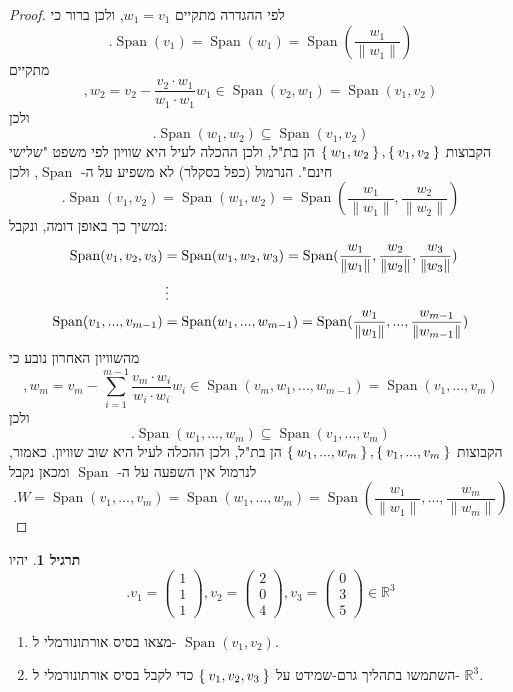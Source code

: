 \documentclass[12pt]{report}
\theoremstyle{plain}
\theoremstyle{definition}
\newtheorem{exercise}{תרגיל}[chapter]
\newcommand{\R}{\mathbb{R}}
\newcommand{\0}{\mathbf{0}}
\DeclareMathOperator{\Span}{Span}
\begin{document}
\begin{proof}
לפי ההגדרה מתקיים
$w_1=v_1$,
ולכן ברור כי
$$
.\Span(v_1)=\Span(w_1)=\Span(\frac{w_1}{\|w_1\|})
$$
מתקיים
$$
,w_2=v_2-\frac{v_2\cdot w_1}{w_1\cdot w_1}w_1\in\Span(v_2,w_1)=\Span(v_1,v_2)
$$
ולכן
$$
.\Span(w_1,w_2)\subseteq\Span(v_1,v_2)
$$
הקבוצות
$\Set{w_1,w_2},\Set{v_1,v_2}$
הן בת"ל, ולכן ההכלה לעיל היא שוויון לפי משפט "שלישי חינם". הנרמול (כפל בסקלר) לא משפיע על ה-
$\Span$,
ולכן 
$$
.\Span(v_1,v_2)=\Span(w_1,w_2)=\Span(\frac{w_1}{\|w_1\|},\frac{w_2}{\|w_2\|})
$$
נמשיך כך באופן דומה, ונקבל:
$$
\begin{aligned}
\Span(v_1,v_2,v_3)&=\Span(w_1,w_2,w_3)=\Span(\frac{w_1}{\|w_1\|},\frac{w_2}{\|w_2\|},\frac{w_3}{\|w_3\|}) \\
&\thinspace\vdots\ \\
\Span(v_1,...,v_{m-1})&=\Span(w_1,...,w_{m-1})=\Span(\frac{w_1}{\|w_1\|},...,\frac{w_{m-1}}{\|w_{m-1}\|})
\end{aligned}
$$
מהשוויון האחרון נובע כי
$$
,w_m=v_m-\sum_{i=1}^{m-1}\frac{v_m\cdot w_i}{w_i\cdot w_i}w_i\in\Span(v_m,w_1,...,w_{m-1})=\Span(v_1,...,v_m)
$$
ולכן
$$
.\Span(w_1,...,w_m)\subseteq\Span(v_1,...,v_m)
$$
הקבוצות
$\Set{w_1,...,w_m},\Set{v_1,...,v_m}$
הן בת"ל, ולכן ההכלה לעיל היא שוב שוויון. כאמור, לנרמול אין השפעה על ה-
$\Span$
ומכאן נקבל
$$
.W=\Span(v_1,...,v_m)=\Span(w_1,...,w_m)=\Span(\frac{w_1}{\|w_1\|},...,\frac{w_m}{\|w_m\|})
$$
\end{proof}

\begin{exercise}
יהיו
$$
.v_1=\begin{pmatrix}1\\1\\1\end{pmatrix},v_2=\begin{pmatrix}2\\0\\4\end{pmatrix},v_3=\begin{pmatrix}0\\3\\5\end{pmatrix}\in\R^3
$$

\begin{enumerate}[label=\alph*.]
\item
מצאו בסיס אורתונורמלי ל-
$\Span(v_1,v_2)$.


\item 
השתמשו בתהליך גרם-שמידט על
$\Set{v_1,v_2,v_3}$
כדי לקבל בסיס אורתונורמלי ל-
$\R^3$.


\end{enumerate}
\end{exercise}
\end{document}
